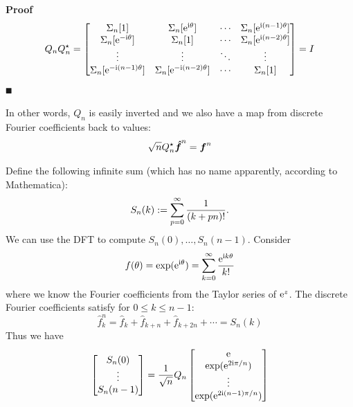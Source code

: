 \textbf{Proof}
\[
Q_n Q_n^\ensuremath{\star}  = \begin{bmatrix} \ensuremath{\Sigma}_n[1] & \ensuremath{\Sigma}_n[{\rm e}^{\I \ensuremath{\theta}}] & \ensuremath{\cdots} & \ensuremath{\Sigma}_n[{\rm e}^{\I (n-1) \ensuremath{\theta}}] \\
                            \ensuremath{\Sigma}_n[{\rm e}^{-\I \ensuremath{\theta}}] & \ensuremath{\Sigma}_n[1] & \ensuremath{\cdots} & \ensuremath{\Sigma}_n[{\rm e}^{\I (n-2) \ensuremath{\theta}}] \\
                            \ensuremath{\vdots} & \ensuremath{\vdots} & \ensuremath{\ddots} & \ensuremath{\vdots} \\
                            \ensuremath{\Sigma}_n[{\rm e}^{-\I(n-1) \ensuremath{\theta}}] & \ensuremath{\Sigma}_n[{\rm e}^{-\I(n-2) \ensuremath{\theta}}] & \ensuremath{\cdots} & \ensuremath{\Sigma}_n[1]
                            \end{bmatrix} = I
\]
\ensuremath{\QED}

In other words, $Q_n$ is easily inverted and we also have a map from discrete Fourier coefficients back to values:
\[
\sqrt{n} Q_n^\star {\mbox{\boldmath$\hat f$\unboldmath}}^n = \bm{{\mbox{\boldmath$f$\unboldmath}}}^n
\]
\begin{example} Define the following infinite sum (which has no name apparently, according to Mathematica):
\[
S_n(k) := \ensuremath{\sum}_{p=0}^\ensuremath{\infty} {1 \over (k+pn)!}.
\]
We can use the DFT to compute $S_n(0), \ensuremath{\ldots}, S_n(n-1)$. Consider
\[
f(\theta) = \exp({\rm e}^{{\rm i} \theta}) = \sum_{k=0}^\infty {{\rm e}^{{\rm i}k \ensuremath{\theta}} \over k!}
\]
where we know the Fourier coefficients from the Taylor series of ${\rm e}^z$. The discrete Fourier coefficients satisfy for $0 \ensuremath{\leq} k \ensuremath{\leq} n-1$:
\[
\hat f_k^n = \hat f_k + \hat f_{k+n} + \hat f_{k+2n} + \ensuremath{\cdots} = S_n(k)
\]
Thus we have
\[
\begin{bmatrix}
S_n(0) \\
\vdots \\
S_n(n-1)
\end{bmatrix} = {1 \over \sqrt{n}} Q_n \begin{bmatrix} {\rm e} \\
                                \exp({\rm e}^{2{\rm i} \pi/n}) \\
                                \vdots \\
                                \exp({\rm e}^{2{\rm i} (n-1) \pi/n}) \end{bmatrix}
\]
\end{example}


